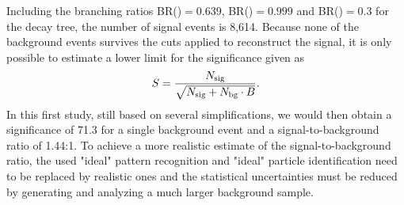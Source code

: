 Including the branching ratios BR()$=0.639$, BR(\decay{\cascade}{\lam}{\piminus})$=0.999$ and BR(\decay{\excitedcascade}{\lam}{\kminus})$=0.3$ \cite{PDG} for the decay tree, the number of signal events is 8,614.
Because none of the background events survives the cuts applied to reconstruct the signal, it is only possible to estimate a lower limit for the significance given as
\begin{equation}
	S = \frac{N_{\textnormal{sig}}}{\sqrt{N_{\textnormal{sig}}+N_{\textnormal{bg}}\cdot B}}.
	\label{eq:significance}
\end{equation}
In this first study, still based on several simplifications, we would then obtain a significance of 71.3 for a single background event and a signal-to-background ratio of 1.44:1.
To achieve a more realistic estimate of the signal-to-background ratio, the used "ideal" pattern recognition and "ideal" particle identification need to be replaced by realistic ones and the statistical uncertainties must be reduced by generating and analyzing a much larger background sample.
 
	